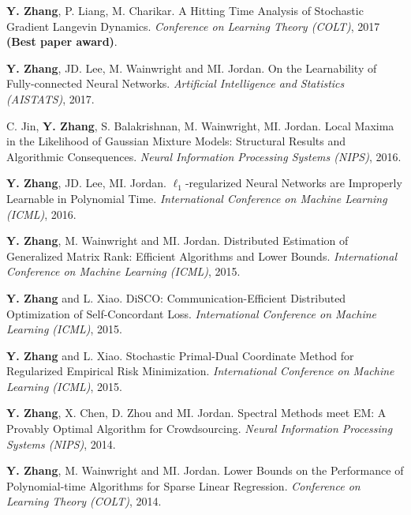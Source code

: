 \documentclass{res} %
\begin{document}
\begin{resume}
\begin{enumerate}[label={[C\arabic*]}, ref={C\arabic*}]
\item  \textbf{Y. Zhang}, P. Liang, M. Charikar. A Hitting Time Analysis of Stochastic Gradient Langevin Dynamics.
\emph{Conference on Learning Theory (COLT)}, 2017 {\bf (Best paper award)}. \label{a-hitting-colt17}

\item \textbf{Y. Zhang}, JD. Lee, M. Wainwright and MI. Jordan. On the Learnability of Fully-connected Neural Networks.
\emph{Artificial Intelligence and Statistics (AISTATS)}, 2017. \label{on-the-learnability-aistats17}

\item C. Jin, {\bf Y. Zhang}, S. Balakrishnan, M. Wainwright, MI. Jordan.  
Local Maxima in the Likelihood of Gaussian Mixture Models: Structural Results and Algorithmic Consequences.
\emph{Neural Information Processing Systems (NIPS)}, 2016. \label{local-nips16}

\item \textbf{Y. Zhang}, JD. Lee, MI. Jordan. $\ell_1$-regularized Neural Networks are Improperly Learnable in Polynomial Time.
\emph{International Conference on Machine Learning (ICML)}, 2016. \label{l1-icml16}

\item \textbf{Y. Zhang}, M. Wainwright and MI. Jordan. Distributed Estimation of Generalized Matrix Rank: Efficient Algorithms and Lower Bounds.
\emph{International Conference on Machine Learning (ICML)}, 2015. \label{distributed-icml15}

\item \textbf{Y. Zhang} and L. Xiao. DiSCO: Communication-Efficient Distributed Optimization of Self-Concordant Loss.
\emph{International Conference on Machine Learning (ICML)}, 2015. \label{communication-icml15}

\item \textbf{Y. Zhang} and L. Xiao. Stochastic Primal-Dual Coordinate Method for Regularized Empirical Risk Minimization.
\emph{International Conference on Machine Learning (ICML)}, 2015.\label{stochastic-icml15}

\item \textbf{Y. Zhang}, X. Chen, D. Zhou and MI. Jordan. Spectral Methods meet EM: A Provably Optimal Algorithm for Crowdsourcing.
\emph{Neural Information Processing Systems (NIPS)}, 2014.\label{spectral-nips14}

\item \textbf{Y. Zhang}, M. Wainwright and MI. Jordan. Lower Bounds on the Performance of Polynomial-time Algorithms for Sparse Linear Regression. \emph{Conference on Learning Theory (COLT)}, 2014. \label{lower-colt14}


\end{enumerate}
\end{resume}
\end{document}
